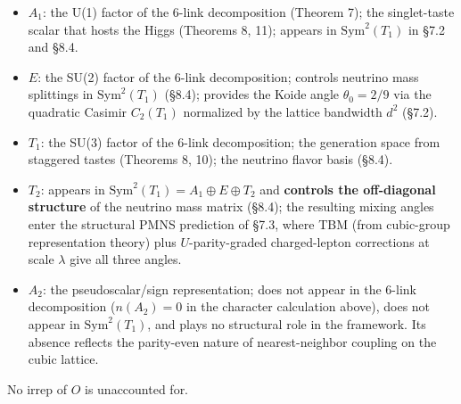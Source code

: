 \documentclass[
]{article}
\providecommand{\tightlist}{%
  \setlength{\itemsep}{0pt}\setlength{\parskip}{0pt}}
\begin{document}
\begin{itemize}
\tightlist
\item
  \(A_1\): the U(1) factor of the 6-link decomposition (Theorem 7); the
  singlet-taste scalar that hosts the Higgs (Theorems 8, 11); appears in
  \(\text{Sym}^2(T_1)\) in §7.2 and §8.4.
\item
  \(E\): the SU(2) factor of the 6-link decomposition; controls neutrino
  mass splittings in \(\text{Sym}^2(T_1)\) (§8.4); provides the Koide
  angle \(\theta_0 = 2/9\) via the quadratic Casimir \(C_2(T_1)\)
  normalized by the lattice bandwidth \(d^2\) (§7.2).
\item
  \(T_1\): the SU(3) factor of the 6-link decomposition; the generation
  space from staggered tastes (Theorems 8, 10); the neutrino flavor
  basis (§8.4).
\item
  \(T_2\): appears in \(\text{Sym}^2(T_1) = A_1 \oplus E \oplus T_2\)
  and \textbf{controls the off-diagonal structure} of the neutrino mass
  matrix (§8.4); the resulting mixing angles enter the structural PMNS
  prediction of §7.3, where TBM (from cubic-group representation theory)
  plus \(U\)-parity-graded charged-lepton corrections at scale
  \(\lambda\) give all three angles.
\item
  \(A_2\): the pseudoscalar/sign representation; does not appear in the
  6-link decomposition (\(n(A_2) = 0\) in the character calculation
  above), does not appear in \(\text{Sym}^2(T_1)\), and plays no
  structural role in the framework. Its absence reflects the parity-even
  nature of nearest-neighbor coupling on the cubic lattice.
\end{itemize}

No irrep of \(O\) is unaccounted for.
\end{document}
